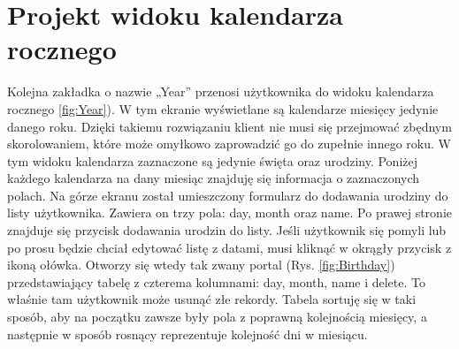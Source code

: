 \section*{Projekt widoku kalendarza rocznego}
Kolejna zakładka o nazwie „Year” przenosi użytkownika do widoku kalendarza rocznego \ref{fig:Year}). W tym ekranie wyświetlane są kalendarze miesięcy jedynie danego roku. Dzięki takiemu rozwiązaniu klient nie musi się przejmować zbędnym skorolowaniem, które może omyłkowo zaprowadzić go do zupełnie innego roku. W tym widoku kalendarza zaznaczone są jedynie święta oraz urodziny. Poniżej każdego kalendarza na dany miesiąc znajduję się informacja o zaznaczonych polach. Na górze ekranu został umieszczony formularz do dodawania urodziny do listy użytkownika. Zawiera on trzy pola: day, month oraz name. Po prawej stronie znajduje się przycisk dodawania urodzin do listy. Jeśli użytkownik się pomyli lub
po prosu będzie chciał edytować listę z datami, musi kliknąć w okrągły przycisk z ikoną ołówka. Otworzy się wtedy tak zwany portal (Rys. \ref{fig:Birthday}) przedstawiający tabelę z czterema kolumnami: day, month, name i delete. To właśnie tam użytkownik może usunąć złe rekordy. Tabela sortuję się w taki sposób, aby na początku zawsze były pola z poprawną kolejnością miesięcy, a następnie w sposób rosnący reprezentuje kolejność dni w miesiącu.


